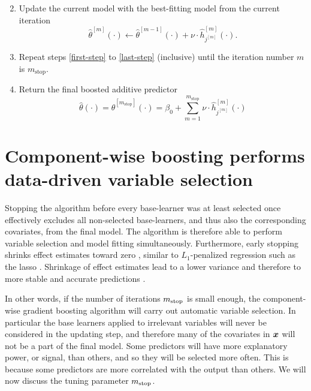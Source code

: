 \begin{algorithm}
\begin{enumerate}
\begin{equation*}
        \end{equation*}
    \item
        \label{last-step}
        Update the current model with the best-fitting model from the current iteration
        \begin{equation*}
            \hat{\theta}^{[m]}(\cdot)\gets \hat{\theta}^{[m-1]}(\cdot)+\nu\cdot \hat{h}_{j^{[m]}}^{[m]}(\cdot).
        \end{equation*}
    \item
        Repeat steps \ref{first-step} to \ref{last-step} (inclusive) until the iteration number $m$ is $m_{\text{stop}}$.
    \item
        Return the final boosted additive predictor
        \begin{equation*}
            \hat{\theta}(\cdot)=\hat{\theta}^{[m_{\text{stop}}]}(\cdot)=\beta_0+\sum_{m=1}^{m_{\text{stop}}}\nu\cdot\hat{h}_{j^{[m]}}^{[m]}(\cdot)
        \end{equation*}
\end{enumerate}
\end{algorithm}

\section{Component-wise boosting performs data-driven variable selection}
\label{sec:variable-selection}
Stopping the algorithm before every base-learner was at least selected once effectively excludes all non-selected base-learners, and thus also the corresponding covariates, from the final model.
The algorithm is therefore able to perform variable selection and model fitting simultaneously.
Furthermore, early stopping shrinks effect estimates toward zero \citep{buhlmann2007, DeBin2016}, similar to $L_1$-penalized regression
such as the lasso \citep{lasso, efron2004}.
Shrinkage of effect estimates lead to a lower variance and therefore to more stable and accurate predictions \citep{efron1975, copas1983, ESL}.


In other words, if the number of iterations $m_{\text{stop}}$ is small enough, the component-wise gradient boosting algorithm will carry out automatic variable selection.
In particular the base learners applied to irrelevant variables will never be considered in the updating step, and therefore many of the covariates in $\bm{x}$ will not be a part of the final model.
Some predictors will have more explanatory power, or signal, than others, and so they will be selected more often.
This is because some predictors are more correlated with the output than others.
We will now discuss the tuning parameter $m_{\text{stop}}$.

